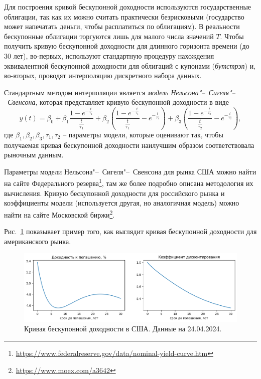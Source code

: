 Для построения кривой бескупонной доходности используются государственные облигации, так как их можно считать практически безрисковыми (государство может напечатать деньги, чтобы расплатиться по облигациям).
В реальности бескупонные облигации торгуются лишь для малого числа значений $T$.
Чтобы получить кривую бескупонной доходности для длинного горизонта времени (до 30 лет), во-первых, используют стандартную процедуру нахождения эквивалентной бескупонной доходности для облигаций с купонами (\emph{бутстрэп}) и, во-вторых, проводят интерполяцию дискретного набора данных. 

Стандартным методом интерполяции является \emph{модель Нельсона"--~Сигеля"--~Свенсона}, которая представляет кривую бескупонной доходности в виде
\[
y(t) = \beta_0 + \beta_1\frac{1-e^{-\frac{t}{\tau_1}}}{\frac t{\tau_1}}
  + \beta_2 \left( \frac{1-e^{-\frac{t}{\tau_1}}}{\frac t{\tau_1}} - e^{-\frac t{\tau_1}}\right)
  + \beta_3 \left( \frac{1-e^{-\frac{t}{\tau_2}}}{\frac t{\tau_2}} - e^{-\frac t{\tau_2}}\right),
\]
где $\beta_1,\beta_2,\beta_3,\tau_1,\tau_2$ -- параметры модели, которые оценивают так, чтобы получаемая кривая бескупонной доходности наилучшим образом соответствовала рыночным данным.

Параметры модели Нельсона"--~Сигеля"--~Свенсона для рынка США можно найти на сайте Федерального резерва\footnote{\url{https://www.federalreserve.gov/data/nominal-yield-curve.htm}}, там же более подробно описана методология их вычисления.
Кривую бескупонной доходности для российского рынка и коэффициенты модели (используется другая, но аналогичная модель) можно найти на сайте Московской биржи\footnote{\url{https://www.moex.com/a3642}}.

Рис.~\ref{11:f:zcb} показывает пример того, как выглядит кривая бескупонной доходности для американского рынка.

\begin{figure}[h]
\centering
\includegraphics[width=\textwidth]{pic/yield-curve.png}
\caption{Кривая бескупонной доходности в США. Данные на 24.04.2024.}
\label{11:f:zcb}
\end{figure}


